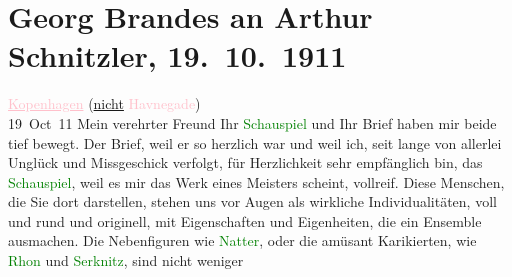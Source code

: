 

               \section[Georg Brandes an Arthur Schnitzler, 19. 10. 1911]{ Georg Brandes an Arthur Schnitzler, 19. 10. 1911}\nopagebreak{}\rehead{ }\normalsize\beginnumbering{} \toendnotes[C]{\smallbreak\pagebreak[2]} 
\toendnotes[C]{\smallbreak}\pstart
           \raggedleft{}{\pb}\textcolor{pink}{\uline{Kopenhagen}}{}\ledrightnote{\textcolor{pink}{Dänemark}} (\uline{nicht}{ }\textcolor{pink}{Havnegade}{}\ledrightnote{\textcolor{pink}{Havnegade}}){\\}19 Oct 11\pend
           \pstart{}Mein verehrter Freund\pend\pstart
           Ihr \textcolor{green}{Schauspiel}{} und Ihr Brief
                    haben mir beide tief bewegt. Der Brief, weil er so herzlich war und weil ich,
                    seit lange von allerlei Unglück und Missgeschick verfolgt, für Herzlichkeit sehr
                    empfänglich bin, das \textcolor{green}{Schauspiel}{}, weil es mir das Werk eines Meisters scheint, vollreif.\pend
           \pstart
           Diese Menschen, die Sie dort darstellen, stehen uns vor Augen als wirkliche
                    Individualitäten, voll und rund und originell, mit Eigenschaften und
                    Eigenheiten, die ein Ensemble ausmachen. Die Nebenfiguren wie \textcolor{green}{Natter}{}, oder die amüsant Karikierten,
                    wie \textcolor{green}{Rhon}{} und \textcolor{green}{Serknitz}{}, sind nicht weniger
